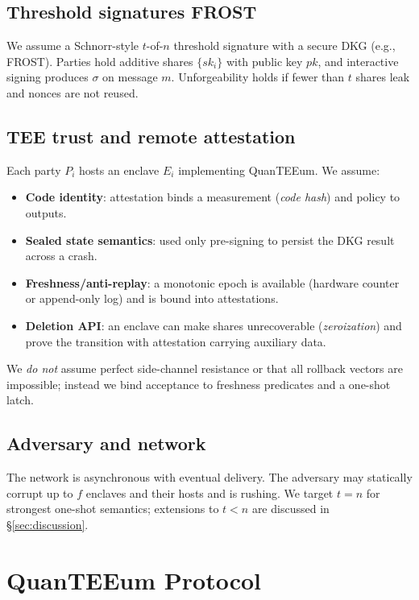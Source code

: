 \documentclass[runningheads,orivec]{llncs}
\newcommand{\prot}{\textsf{QuanTEEum}}
\newcommand{\FROST}{\textsf{FROST}}
\newcommand{\cFROST}{\FROST{}~\cite{komlo2020frost}}
\begin{document}
\subsection{Threshold signatures \cFROST{}}
We assume a Schnorr-style $t$-of-$n$ threshold signature with a secure DKG (e.g., \FROST{}). Parties hold additive shares $\{sk_i\}$ with public key $pk$, and interactive signing produces $\sigma$ on message $m$. Unforgeability holds if fewer than $t$ shares leak and nonces are not reused.

\subsection{TEE trust and remote attestation}
Each party $P_i$ hosts an enclave $E_i$ implementing \prot{}. We assume:
\begin{itemize}[leftmargin=*,itemsep=0.25em]
  \item \textbf{Code identity}: attestation binds a measurement (\emph{code hash}) and policy to outputs.
  \item \textbf{Sealed state semantics}: used only pre-signing to persist the DKG result across a crash.
  \item \textbf{Freshness/anti-replay}: a monotonic epoch is available (hardware counter or append-only log) and is bound into attestations.
  \item \textbf{Deletion API}: an enclave can make shares unrecoverable (\emph{zeroization}) and prove the transition with attestation carrying auxiliary data.
\end{itemize}
We \emph{do not} assume perfect side-channel resistance or that all rollback vectors are impossible; instead we bind acceptance to freshness predicates and a one-shot latch.

\subsection{Adversary and network}
The network is asynchronous with eventual delivery. The adversary may statically corrupt up to $f$ enclaves and their hosts and is rushing. We target $t=n$ for strongest one-shot semantics; extensions to $t<n$ are discussed in \S\ref{sec:discussion}.

\section{\prot{} Protocol}\label{sec:protocol}
\end{document}
